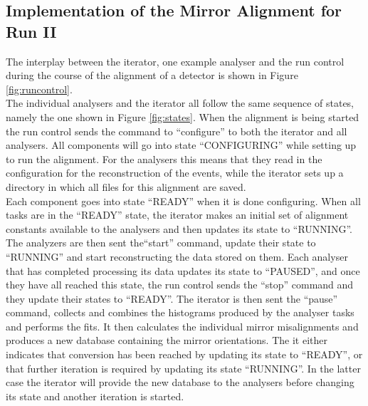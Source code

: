 \subsection{Implementation of the \rich Mirror Alignment for Run II}
\label{subsec:implementation}
The interplay between the iterator, one example analyser and the run control during the course of the alignment of a \rich detector is shown in Figure \ref{fig:runcontrol}.\\
The individual analysers and the iterator all follow the same sequence of states, namely the one shown in Figure \ref{fig:states}. When the alignment is being started the run control sends the command to ``configure'' to both the iterator and all analysers. All components will go into state ``CONFIGURING'' while setting up to run the alignment. For the analysers this means that they read in the configuration for the reconstruction of the events, while the iterator sets up a directory in which all files for this alignment are saved.\\
Each component goes into state ``READY'' when it is done configuring. When all tasks are in the ``READY'' state, the iterator makes an initial set of alignment constants available to the analysers and then updates its state to ``RUNNING''. The analyzers are then sent the``start'' command, update their state to ``RUNNING'' and start reconstructing the data stored on them. Each analyser that has completed processing its data updates its state to ``PAUSED'', and once they have all reached this state, the run control sends the “stop” command and they update their states to ``READY''. The iterator is then sent the ``pause'' command, collects and combines the histograms produced by the analyser tasks and performs the fits. It then calculates the individual mirror misalignments and produces a new database containing the mirror orientations. The it either indicates that conversion has been reached by updating its state to ``READY'', or that further iteration is required by updating its state ``RUNNING''. In the latter case the iterator will provide the new database to the analysers before changing its state and another iteration is started.\\

